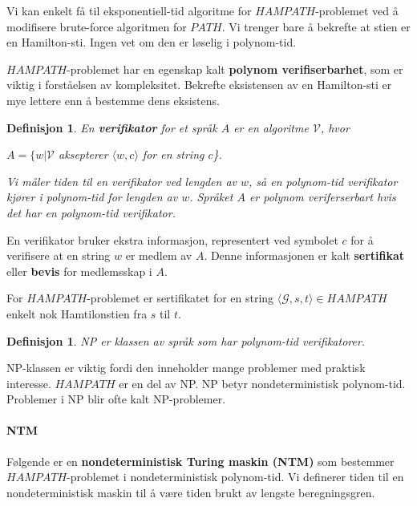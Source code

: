 \documentclass[11pt,a4paper]{article}
\begin{document}
Vi kan enkelt få til eksponentiell-tid algoritme for $HAMPATH$-problemet ved å modifisere brute-force algoritmen for $PATH$. Vi trenger bare å bekrefte at stien er en Hamilton-sti. Ingen vet om den er løselig i polynom-tid.

$HAMPATH$-problemet har en egenskap kalt \textbf{polynom verifiserbarhet}, som er viktig i forståelsen av kompleksitet. Bekrefte eksistensen av en Hamilton-sti er mye lettere enn å bestemme dens eksistens.

\theoremstyle{mytheoremstyle}
\newtheorem{ver}{Definisjon}[section]
\begin{ver}
En \textbf{verifikator} for et språk $A$ er en algoritme $\mathcal{V}$, hvor
\begin{center}
$A = \{w | \mathcal{V}$ aksepterer $\langle w,c\rangle$ for en string $c$\}.
\end{center}
Vi måler tiden til en verifikator ved lengden av $w$, så en polynom-tid verifikator kjører i polynom-tid for lengden av $w$. Språket $A$ er polynom veriferserbart hvis det har en polynom-tid verifikator.
\end{ver}

En verifikator bruker ekstra informasjon, representert ved symbolet $c$ for å verifisere at en string $w$ er medlem av $A$. Denne informasjonen er kalt \textbf{sertifikat} eller \textbf{bevis} for medlemsskap i $A$.

For $HAMPATH$-problemet er sertifikatet for en string $\langle \mathcal{G} ,s,t\rangle \in HAMPATH$ enkelt nok Hamtilonstien fra $s$ til $t$.

\theoremstyle{mytheoremstyle}
\newtheorem{np}{Definisjon}[section]
\begin{np}
NP er klassen av språk som har polynom-tid verifikatorer.
\end{np}

NP-klassen er viktig fordi den inneholder mange problemer med praktisk interesse. $HAMPATH$ er en del av NP. NP betyr nondeterministisk polynom-tid. Problemer i NP blir ofte kalt NP-problemer.

\paragraph{NTM}
Følgende er en \textbf{nondeterministisk Turing maskin (NTM)} som bestemmer $HAMPATH$-problemet i nondeterministisk polynom-tid. Vi definerer tiden til en nondeterministisk maskin til å være tiden brukt av lengste beregningsgren.
\end{document}
